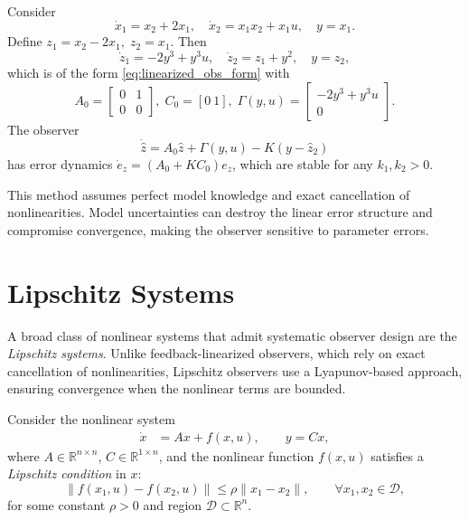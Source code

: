\begin{example}
Consider
\[
\dot{x}_1 = x_2 + 2x_1, \quad
\dot{x}_2 = x_1 x_2 + x_1 u, \quad
y = x_1.
\]
Define \(z_1 = x_2 - 2x_1,\; z_2 = x_1.\)  
Then
\[
\dot{z}_1 = -2y^3 + y^3u, \quad
\dot{z}_2 = z_1 + y^2, \quad
y = z_2,
\]
which is of the form \eqref{eq:linearized_obs_form} with
\[
A_0 = \begin{bmatrix}0 & 1\\0 & 0\end{bmatrix},\;
C_0 = [0~1],\;
\Gamma(y,u) =
\begin{bmatrix}
-2y^3 + y^3u \\[2pt] 0
\end{bmatrix}.
\]
The observer
\[
\dot{\hat{z}} = A_0\hat{z} + \Gamma(y,u) - K(y - \hat{z}_2)
\]
has error dynamics \(\dot{e}_z = (A_0 + K C_0)e_z\), which are stable for any \(k_1,k_2>0\).
\end{example}

\begin{remark}
This method assumes perfect model knowledge and exact cancellation of nonlinearities.  
Model uncertainties can destroy the linear error structure and compromise convergence, making the observer sensitive to parameter errors.
\end{remark}

\section{Lipschitz Systems}

A broad class of nonlinear systems that admit systematic observer design are the
\emph{Lipschitz systems}.  
Unlike feedback-linearized observers, which rely on exact cancellation of nonlinearities,
Lipschitz observers use a Lyapunov-based approach, ensuring convergence when the nonlinear terms are bounded.

\noindent Consider the nonlinear system
\begin{align}
    \dot{x} &= A x + f(x,u), \qquad y = Cx, \label{eq:lipschitz_system}
\end{align}
where \(A \in \mathbb{R}^{n\times n}\), \(C \in \mathbb{R}^{1\times n}\), and the nonlinear function \(f(x,u)\)
satisfies a \emph{Lipschitz condition} in \(x\):
\begin{equation}\label{eq:lipschitz_condition}
    \| f(x_1,u) - f(x_2,u) \| \le \rho \|x_1 - x_2\|, 
    \qquad \forall x_1, x_2 \in \mathcal{D},
\end{equation}
for some constant \(\rho > 0\) and region \(\mathcal{D} \subset \mathbb{R}^n\).

